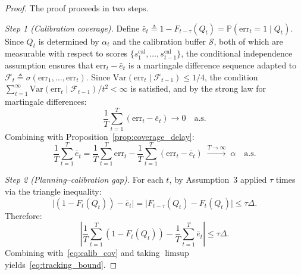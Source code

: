 \documentclass[letterpaper, 10 pt, conference]{ieeeconf}  %
\begin{document}
\begin{proof}
The proof proceeds in two steps.

\emph{Step 1 (Calibration coverage).}
Define $\bar{e}_t \triangleq 1 - F_{t-\tau}(Q_t) = \mathbb{P}(\text{err}_t = 1 \mid Q_t)$. Since $Q_t$ is determined by $\alpha_t$ and the calibration buffer $\mathcal{S}$, both of which are measurable with respect to scores $\{s_1^{\text{cal}}, \dots, s_{t-1}^{\text{cal}}\}$, the conditional independence assumption ensures that $\text{err}_t - \bar{e}_t$ is a martingale difference sequence adapted to $\mathcal{F}_t \triangleq \sigma(\text{err}_1, \dots, \text{err}_t)$. Since $\text{Var}(\text{err}_t \mid \mathcal{F}_{t-1}) \le 1/4$, the condition $\sum_{t=1}^{\infty} \text{Var}(\text{err}_t \mid \mathcal{F}_{t-1})/t^2 < \infty$ is satisfied, and by the strong law for martingale differences:
\begin{equation}
    \frac{1}{T}\sum_{t=1}^T (\text{err}_t - \bar{e}_t) \to 0 \quad \text{a.s.}
    \label{eq:slln_mg}
\end{equation}
Combining with Proposition~\ref{prop:coverage_delay}:
\begin{equation}
    \frac{1}{T}\sum_{t=1}^T \bar{e}_t = \frac{1}{T}\sum_{t=1}^T \text{err}_t - \frac{1}{T}\sum_{t=1}^T (\text{err}_t - \bar{e}_t) \;\xrightarrow{T \to \infty}\; \alpha \quad \text{a.s.}
    \label{eq:calib_cov}
\end{equation}

\emph{Step 2 (Planning--calibration gap).}
For each $t$, by Assumption~3 applied $\tau$ times via the triangle inequality:
\begin{equation}
    \bigl|(1 - F_t(Q_t)) - \bar{e}_t\bigr| = \bigl|F_{t-\tau}(Q_t) - F_t(Q_t)\bigr| \le \tau\Delta.
    \label{eq:cdf_gap}
\end{equation}
Therefore:
\begin{equation}
    \left|\frac{1}{T}\sum_{t=1}^T (1 - F_t(Q_t)) - \frac{1}{T}\sum_{t=1}^T \bar{e}_t\right| \le \tau\Delta.
\end{equation}
Combining with~\eqref{eq:calib_cov} and taking $\limsup$ yields~\eqref{eq:tracking_bound}.
\end{proof}
\end{document}

